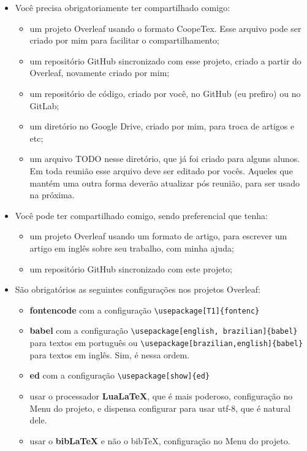 \documentclass{article}
\begin{document}
\begin{itemize}
    \item Você precisa obrigatoriamente ter compartilhado comigo:
    \begin{itemize}
        \item um projeto Overleaf usando o formato CoopeTex. Esse arquivo pode ser criado por mim para facilitar o compartilhamento;
        \item um repositório GitHub sincronizado com esse projeto, criado a partir do Overleaf, novamente criado por mim;
        \item um repositório de código, criado por você, no GitHub (eu prefiro) ou no GitLab;
        \item um diretório no Google Drive, criado por mim, para troca de artigos e etc;
        \item um arquivo TODO nesse diretório, que já foi criado para alguns alunos. Em toda reunião esse arquivo deve ser editado por vocês. Aqueles que mantém uma outra forma deverão atualizar pós reunião, para ser usado na próxima.
    \end{itemize}
    \item Você pode ter compartilhado comigo, sendo preferencial que tenha:
    \begin{itemize}
        \item um projeto Overleaf usando um formato de artigo, para escrever um artigo em inglês sobre seu trabalho, com minha ajuda;
        \item um repositório GitHub sincronizado com este projeto;
    \end{itemize}
    \item São obrigatórios as seguintes configurações nos projetos Overleaf:
    \begin{itemize}
        \item \textbf{fontencode} com a configuração \verb!\usepackage[T1]{fontenc}!
        \item \textbf{babel} com a configuração \verb!\usepackage[english, brazilian]{babel}! para textos em português ou \verb!\usepackage[brazilian,english]{babel}! para textos em inglês. Sim, é nessa ordem.
        \item \textbf{ed} com a configuração \verb!\usepackage[show]{ed}!
        \item usar o processador \textbf{LuaLaTeX}, que é mais poderoso, configuração no Menu do projeto, e dispensa configurar para usar utf-8, que é natural dele.
        \item usar o \textbf{bibLaTeX} e não o bibTeX, configuração no Menu do projeto.
    \end{itemize}
\end{itemize}
\end{document}

